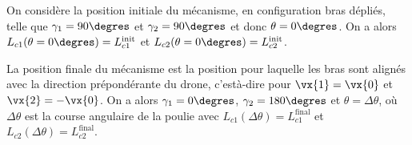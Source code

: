 On considère la position initiale du mécanisme, en configuration bras dépliés, telle que
$\gamma_1= 90\degres$ et $\gamma_2 = 90\degres$ et donc $\theta = 0\degres$. On a alors $L_{c1}(\theta = 0\degres) = L^{\text{init}}_{c1}$ et $L_{c2}(\theta = 0\degres) = L^{\text{init}}_{c2}$.

La position finale du mécanisme est la position pour laquelle les bras sont alignés avec la
direction prépondérante du drone, c’est­à-dire pour $\vx{1} = \vx{0}$ et $\vx{2} = -\vx{0}$. On a alors $\gamma_1 = 0\degres$, $\gamma_2 = 180\degres$ et $\theta = \Delta \theta$, où $\Delta \theta$ est la course angulaire de la poulie avec $L_{c1}(\Delta \theta) = L^{\text{final}}_{c1}$ et
$L_{c2}(\Delta \theta) = L^{\text{final}}_{c2}$.